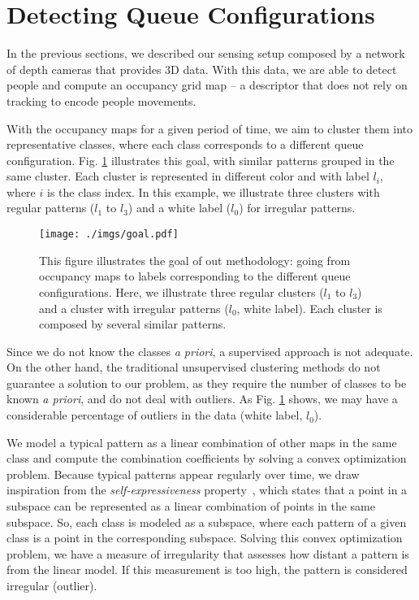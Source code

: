 \section{Detecting Queue Configurations}
\label{sec:charact}
In the previous sections, we described our sensing setup composed by a network of depth cameras that provides 3D data. 
With this data, we are able to detect people and compute an occupancy grid map -- a descriptor that does not rely on tracking to encode people movements.

With the occupancy maps for a given period of time, we aim to cluster them into representative classes, where each class corresponds to a different queue configuration. 
Fig. \ref{fig:goal} illustrates this goal, with similar patterns grouped in the same cluster. 
Each cluster is represented in different color and with label $l_i$, where $i$ is the class index.
In this example, we illustrate three clusters with regular patterns ($l_1$ to $l_3$) and a white label ($l_0$) for irregular patterns.
\begin{figure}[tbh]
\centering
\texttt{[image: ./imgs/goal.pdf]}
\caption{This figure illustrates the goal of out methodology: going from occupancy maps to labels corresponding to the different queue configurations. Here, we illustrate three regular clusters ($l_1$ to $l_3$) and a cluster with irregular patterns ($l_0$, white label). Each cluster is composed by several similar patterns.}
\label{fig:goal}
\end{figure}
%
Since we do not know the classes \emph{a priori}, a supervised approach is not adequate. 
On the other hand, the traditional unsupervised clustering methods do not guarantee a solution to our problem, as they require the number of classes to be known \emph{a priori}, and do not deal with outliers. 
As Fig. \ref{fig:goal} shows, we may have a considerable percentage of outliers in the data (white label, $l_0$). 

We model a typical pattern as a linear combination of other maps in the same class and compute the combination coefficients by solving a convex optimization problem. 
Because typical patterns appear regularly over time, we draw inspiration from the \emph{self-expressiveness} property~\cite{soltanolkotabi2012geometric,elhamifar2013sparse}, which states that a point in a subspace can be represented as a linear combination of points in the same subspace.
So, each class is modeled as a subspace, where each pattern of a given class is a point in the corresponding subspace. 
Solving this convex optimization problem, we have a measure of irregularity that assesses how distant a pattern is from the linear model. If this measurement is too high, the pattern is considered irregular (outlier).

